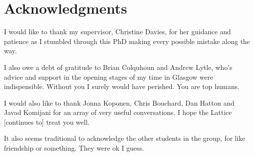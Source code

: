 \documentclass[a4paper,11pt,twoside]{ThesisStyle}
\begin{document}


\section*{Acknowledgments}

I would like to thank my supervisor, Christine Davies, for her guidance and patience as I stumbled through this PhD making every possible mistake along the way. 

I also owe a debt of gratitude to Brian Colquhoun and Andrew Lytle, who's advice and support in the opening stages of my time in Glasgow were indispensible. Without you I surely would have perished. You are top humans.

I would also like to thank Jonna Koponen, Chris Bouchard, Dan Hatton and Javad Komijani for an array of very useful conversations. I hope the Lattice [continues to] treat you well.

It also seems traditional to acknowledge the other students in the group, for like friendship or something. They were ok I guess. 

\newpage

\tableofcontents
\mainmatter

\pagestyle{fancy}
\fancyhf{}
\fancyhead[LE,RO]{\thepage}
\fancyhead[RE]{\nouppercase{\leftmark}}
\fancyhead[LO]{\nouppercase{\rightmark}}







% 

\listoffigures
%  
\listoftables




\end{document}
